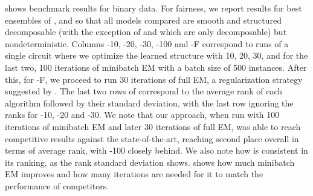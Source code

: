  shows benchmark results for binary data. For fairness, we report results for best
ensembles of ,  and  so that all models
compared are smooth and structured decomposable (with the exception of  and
 which are only decomposable) but nondeterministic. Columns
-10, -20, -30, -100 and
-F correspond to runs of a single  circuit where we optimize
the learned structure with 10, 20, 30, and for the last two, 100 iterations of minibatch EM with a
batch size of 500 instances. After this, for -F, we proceed to run 30 iterations
of full EM, a regularization strategy suggested by \citet{liu21}. The last two rows of
 correspond to the average rank of each algorithm followed by their standard
deviation, with the last row ignoring the ranks for -10, -20
and -30. We note that our approach, when run with 100 iterations of minibatch EM
and later 30 iterations of full EM, was able to reach competitive results against the
state-of-the-art, reaching second place overall in terms of average rank, with
-100 closely behind. We also note how  is consistent in its
ranking, as the rank standard deviation shows.  shows how much minibatch
EM improves  and how many iterations are needed for it to match the performance
of competitors.

